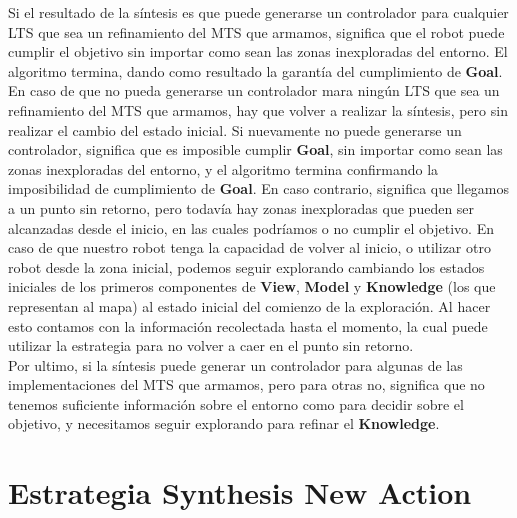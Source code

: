 \vspace{\baselineskip}
Si el resultado de la síntesis es que puede generarse un controlador para cualquier LTS que sea un refinamiento del MTS que armamos, significa que el robot
puede cumplir el objetivo sin importar como sean las zonas inexploradas del entorno. El algoritmo termina, dando como resultado la garantía del cumplimiento
de \textbf{Goal}.\\
En caso de que no pueda generarse un controlador mara ningún LTS que sea un refinamiento del MTS que armamos, hay que volver a realizar la síntesis, pero sin
realizar el cambio del estado inicial. Si nuevamente no puede generarse un controlador, significa que es imposible cumplir \textbf{Goal}, sin importar como sean
las zonas inexploradas del entorno, y el algoritmo termina confirmando la imposibilidad de cumplimiento de \textbf{Goal}. En caso contrario, significa que
llegamos a un punto sin retorno, pero todavía hay zonas inexploradas que pueden ser alcanzadas desde el inicio, en las cuales podríamos o no cumplir el objetivo.
En caso de que nuestro robot tenga la capacidad de volver al inicio, o utilizar otro robot desde la zona inicial, podemos seguir explorando cambiando los
estados iniciales de los primeros componentes de \textbf{View}, \textbf{Model} y \textbf{Knowledge} (los que representan al mapa) al estado inicial del comienzo
de la exploración. Al hacer esto contamos con la información recolectada hasta el momento, la cual puede utilizar la estrategia para no volver a caer en el
punto sin retorno.\\
Por ultimo, si la síntesis puede generar un controlador para algunas de las implementaciones del MTS que armamos, pero para otras no, significa que no tenemos
suficiente información sobre el entorno como para decidir sobre el objetivo, y necesitamos seguir explorando para refinar el \textbf{Knowledge}.

\section{Estrategia Synthesis New Action}

